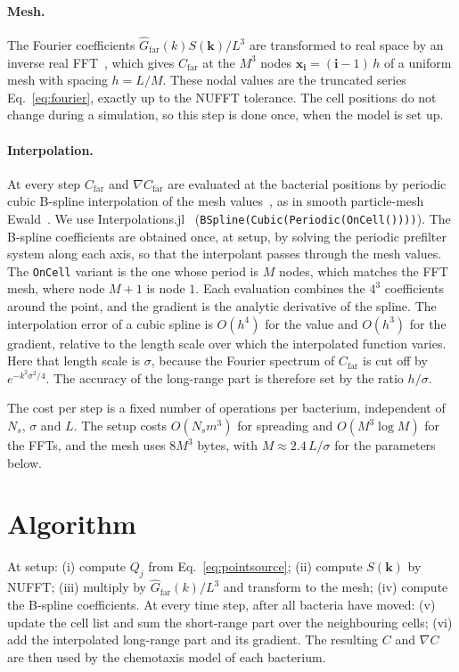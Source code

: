 \documentclass[11pt,a4paper]{article}
\newcommand{\vect}[1]{\mathbf{#1}}
\begin{document}
\paragraph{Mesh.}
The Fourier coefficients $\hat G_{\mathrm{far}}(k) S(\vect{k})/L^3$ are transformed to real space
by an inverse real FFT~\cite{FFTW}, which gives $C_{\mathrm{far}}$ at the $M^3$ nodes
$\vect{x}_{\vect{i}} = (\vect{i}-1)\,h$ of a uniform mesh with spacing $h = L/M$. These nodal
values are the truncated series Eq.~\eqref{eq:fourier}, exactly up to the NUFFT tolerance. The
cell positions do not change during a simulation, so this step is done once, when the model is
set up.

\paragraph{Interpolation.}
At every step $C_{\mathrm{far}}$ and $\nabla C_{\mathrm{far}}$ are evaluated at the bacterial
positions by periodic cubic B-spline interpolation of the mesh values~\cite{Unser1993}, as in
smooth particle-mesh Ewald~\cite{Darden1993,Essmann1995}. We use Interpolations.jl~\cite{Interpolations}
(\texttt{BSpline(Cubic(Periodic(OnCell())))}). The B-spline coefficients are obtained once, at
setup, by solving the periodic prefilter system along each axis, so that the interpolant passes
through the mesh values. The \texttt{OnCell} variant is the one whose period is $M$ nodes, which
matches the FFT mesh, where node $M+1$ is node $1$. Each evaluation combines the $4^3$ coefficients
around the point, and the gradient is the analytic derivative of the spline. The interpolation
error of a cubic spline is $O(h^4)$ for the value and $O(h^3)$ for the gradient, relative to the
length scale over which the interpolated function varies. Here that length scale is $\sigma$,
because the Fourier spectrum of $C_{\mathrm{far}}$ is cut off by $e^{-k^2\sigma^2/4}$. The accuracy
of the long-range part is therefore set by the ratio $h/\sigma$.

The cost per step is a fixed number of operations per bacterium, independent of $N_s$, $\sigma$ and
$L$. The setup costs $O(N_s m^3)$ for spreading and $O(M^3\log M)$ for the FFTs, and the mesh uses
$8M^3$ bytes, with $M \approx 2.4\,L/\sigma$ for the parameters below.

\section{Algorithm}

At setup: (i) compute $Q_j$ from Eq.~\eqref{eq:pointsource}; (ii) compute $S(\vect{k})$ by NUFFT;
(iii) multiply by $\hat G_{\mathrm{far}}(k)/L^3$ and transform to the mesh; (iv) compute the
B-spline coefficients. At every time step, after all bacteria have moved: (v) update the cell list
and sum the short-range part over the neighbouring cells; (vi) add the interpolated long-range part
and its gradient. The resulting $C$ and $\nabla C$ are then used by the chemotaxis model of each
bacterium.
\end{document}
